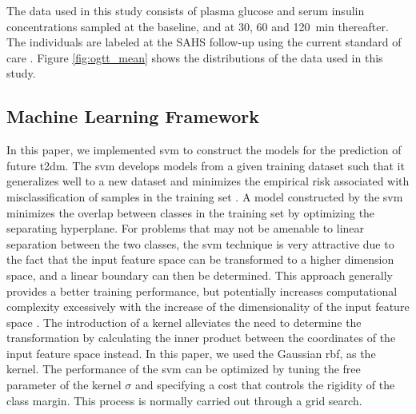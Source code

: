 \documentclass[journal,comsoc]{IEEEtran}
\renewcommand{\^}{\hat}  %
\begin{document}
The data used in this study consists of plasma glucose and serum insulin concentrations sampled at the baseline, and at \num{30}, \num{60} and \SI{120}{\minute} thereafter. The individuals are labeled at the SAHS follow-up using the current standard of care \cite{burke_rapid_1999}. Figure \ref{fig:ogtt_mean} shows the distributions of the data used in this study.
%
%
\subsection{Machine Learning Framework}
%
In this paper, we implemented \ac{svm} to construct the models for the prediction of future \ac{t2dm}. The \ac{svm} develops models from a given training dataset such that it generalizes well to a new dataset and minimizes the empirical risk associated with misclassification of samples in the training set \cite{vapnik_nature_2000,vapnik2015uniform}. A model constructed by the \ac{svm} minimizes the overlap between classes in the training set by optimizing the separating hyperplane. For problems that may not be amenable to linear separation between the two classes, the \ac{svm} technique is very attractive due to the fact that the input feature space can be transformed to a higher dimension space,  and a linear boundary can then be determined. This approach generally provides a better training performance, but potentially increases computational complexity excessively with the increase of the dimensionality of the input feature space \cite{friedman2001elements}. The introduction of a kernel alleviates the need to determine the transformation by calculating the inner product between the coordinates of the input feature space instead. In this paper, we used the Gaussian \ac{rbf}, as the kernel. The performance of the \ac{svm} can be optimized by tuning the free parameter of the kernel $\sigma$ and specifying a cost that controls the rigidity of the class margin. This process is normally carried out through a grid search.
%
%
%
%
\end{document}
